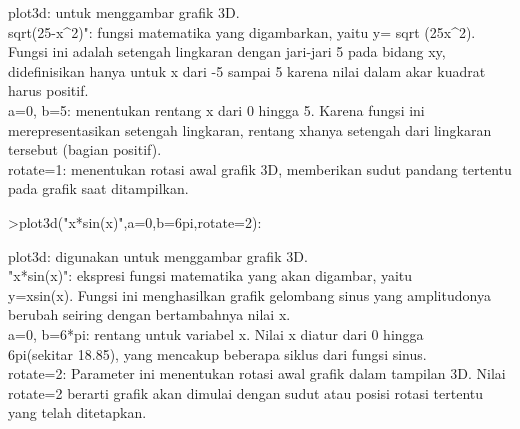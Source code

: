 \documentclass{article}
\begin{document}
\begin{eulernotebook}
\begin{eulercomment}
\begin{eulercomment}
\begin{eulerprompt}
\end{eulerprompt}
\begin{eulercomment}
plot3d: untuk menggambar grafik 3D.\\
sqrt(25-x\textasciicircum{}2)": fungsi matematika yang digambarkan, yaitu y= sqrt
(25x\textasciicircum{}2). Fungsi ini adalah setengah lingkaran dengan jari-jari 5 pada
bidang xy, didefinisikan hanya untuk x dari -5 sampai 5 karena nilai
dalam akar kuadrat harus positif.\\
a=0, b=5: menentukan rentang x dari 0 hingga 5. Karena fungsi ini
merepresentasikan setengah lingkaran, rentang xhanya setengah dari
lingkaran tersebut (bagian positif).\\
rotate=1: menentukan rotasi awal grafik 3D, memberikan sudut pandang
tertentu pada grafik saat ditampilkan.
\end{eulercomment}
\begin{eulerprompt}
>plot3d("x*sin(x)",a=0,b=6pi,rotate=2):
\end{eulerprompt}
\begin{eulercomment}
plot3d: digunakan untuk menggambar grafik 3D.\\
"x*sin(x)": ekspresi fungsi matematika yang akan digambar, yaitu\\
y=xsin(x). Fungsi ini menghasilkan grafik gelombang sinus yang
amplitudonya berubah seiring dengan bertambahnya nilai x.\\
a=0, b=6*pi: rentang untuk variabel x. Nilai x diatur dari 0 hingga\\
6pi(sekitar 18.85), yang mencakup beberapa siklus dari fungsi sinus.\\
rotate=2: Parameter ini menentukan rotasi awal grafik dalam tampilan
3D. Nilai rotate=2 berarti grafik akan dimulai dengan sudut atau
posisi rotasi tertentu yang telah ditetapkan.


\end{eulercomment}
\end{eulercomment}
\end{eulercomment}
\end{eulernotebook}
\end{document}
